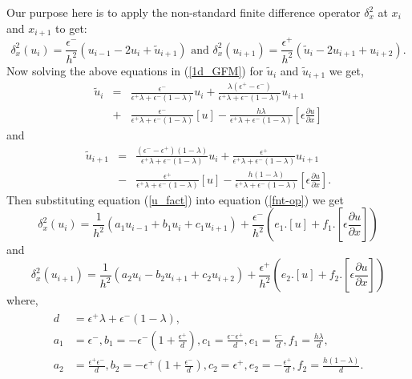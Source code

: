 Our purpose here is to apply the non-standard finite difference operator $\delta_x^2$ at $x_i$ and $x_{i+1}$ to get: 
\begin{equation}
\delta_x^2\left(u_{i}\right)= \frac{\epsilon^-}{h^2} \left(u_{i-1}-2u_{i}+\tilde{u}_{i+1}\right)\text{ and }\delta_x^2\left(u_{i+1}\right)= \frac{\epsilon^+}{h^2} \left(\tilde{u}_{i}-2u_{i+1}+u_{i+2}\right).	\label{fnt-op}
\end{equation}
Now solving the above equations in (\ref{1d_GFM})  for $\tilde{u}_i $ and $\tilde{u}_{i+1}$ we get, 
\begin{eqnarray}	\tilde{u}_i&=& \frac{\epsilon^-}{\epsilon^+\lambda+\epsilon^-(1-\lambda)}u_i +\frac{\lambda(\epsilon^+-\epsilon^-)}{\epsilon^+\lambda+\epsilon^-(1-\lambda)}u_{i+1}\nonumber\\ &+&\frac{\epsilon^-}{\epsilon^+\lambda+\epsilon^-(1-\lambda)}\left[u\right] -\frac{h \lambda}{\epsilon^+\lambda+\epsilon^-(1-\lambda)}\left[ \epsilon \frac{\partial u}{\partial x} \right]
\end{eqnarray}
and 
\begin{eqnarray}		
	\tilde{u}_{i+1}&=& \frac{(\epsilon^--\epsilon^+)(1-\lambda)}{\epsilon^+\lambda+\epsilon^-(1-\lambda)} u_i +\frac{\epsilon^+}{\epsilon^+\lambda+\epsilon^-(1-\lambda)} u_{i+1}\nonumber \\
	&-&\frac{\epsilon^+}{\epsilon^+\lambda+\epsilon^-(1-\lambda)} \left[u\right] -\frac{h(1-\lambda)}{\epsilon^+\lambda+\epsilon^-(1-\lambda)}\left[ \epsilon \frac{\partial u}{\partial x} \right].\label{u_fact}
\end{eqnarray}
Then substituting equation (\ref{u_fact}) into equation (\ref{fnt-op}) we get
\begin{equation}
		\delta_x^2\left(u_{i}\right)= \frac{1}{h^2} \left(a_1u_{i-1}+b_1 u_{i}+c_1u_{i+1}\right)+\frac{\epsilon^-}{h^2}\left(e_1.[u]+f_1.\left[ \epsilon \frac{\partial u}{\partial x} \right]\right)\label{fnt-op-1}
\end{equation}
and 
\begin{equation}		
		\delta_x^2\left(u_{i+1}\right)= \frac{1}{h^2} \left(a_2u_{i}-b_2u_{i+1}+c_2u_{i+2}\right)+\frac{\epsilon^+}{h^2}\left(e_2.[u]+f_2.\left[ \epsilon \frac{\partial u}{\partial x} \right]\right)\label{fnt-op-2}
\end{equation}
where,
\begin{eqnarray}
\begin{aligned}
d&=\epsilon^+\lambda+\epsilon^-(1-\lambda),\\
a_1&= \epsilon^-,b_1=-\epsilon^-\left(1+\frac{\epsilon^+}{d}\right), c_1=\frac{\epsilon^-\epsilon^+}{d}, e_1=\frac{\epsilon^-}{d},f_1=\frac{h\lambda}{d},\\
a_2&= \frac{\epsilon^+\epsilon^-}{d},b_2=-\epsilon^+\left(1+\frac{\epsilon^-}{d}\right), c_2=\epsilon^+, e_2=-\frac{\epsilon^+}{d},f_2=\frac{h(1-\lambda)}{d}.
\end{aligned}
\end{eqnarray}
